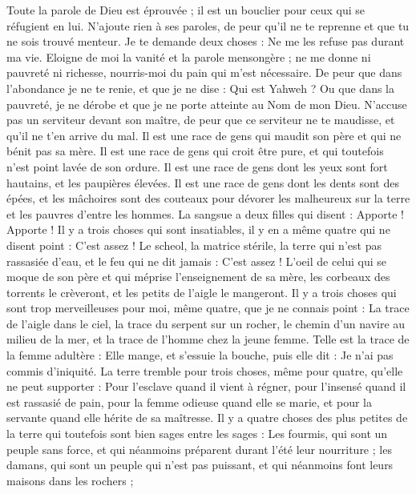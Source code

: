 \begin{multicols}{2}
Toute la parole de Dieu est éprouvée ; il est un bouclier pour ceux qui se réfugient en lui.
N'ajoute rien à ses paroles, de peur qu'il ne te reprenne et que tu ne sois trouvé menteur.
Je te demande deux choses : Ne me les refuse pas durant ma vie.
Eloigne de moi la vanité et la parole mensongère ; ne me donne ni pauvreté ni richesse, nourris-moi du pain qui m’est nécessaire.
De peur que dans l’abondance je ne te renie, et que je ne dise : Qui est Yahweh ? Ou que dans la pauvreté, je ne dérobe et que je ne porte atteinte au Nom de mon Dieu.
N’accuse pas un serviteur devant son maître, de peur que ce serviteur ne te maudisse, et qu'il ne t'en arrive du mal.
Il est une race de gens qui maudit son père et qui ne bénit pas sa mère.
Il est une race de gens qui croit être pure, et qui toutefois n'est point lavée de son ordure.
Il est une race de gens dont les yeux sont fort hautains, et les paupières élevées.
Il est une race de gens dont les dents sont des épées, et les mâchoires sont des couteaux pour dévorer les malheureux sur la terre et les pauvres d’entre les hommes.
La sangsue a deux filles qui disent : Apporte ! Apporte ! Il y a trois choses qui sont insatiables, il y en a même quatre qui ne disent point : C'est assez !
Le scheol, la matrice stérile, la terre qui n'est pas rassasiée d'eau, et le feu qui ne dit jamais : C'est assez !
L'oeil de celui qui se moque de son père et qui méprise l'enseignement de sa mère, les corbeaux des torrents le crèveront, et les petits de l'aigle le mangeront.
Il y a trois choses qui sont trop merveilleuses pour moi, même quatre, que je ne connais point :
La trace de l'aigle dans le ciel, la trace du serpent sur un rocher, le chemin d'un navire au milieu de la mer, et la trace de l'homme chez la jeune femme.
Telle est la trace de la femme adultère : Elle mange, et s'essuie la bouche, puis elle dit : Je n'ai pas commis d'iniquité.
La terre tremble pour trois choses, même pour quatre, qu’elle ne peut supporter :
Pour l’esclave quand il vient à régner, pour l'insensé quand il est rassasié de pain,
pour la femme odieuse quand elle se marie, et pour la servante quand elle hérite de sa maîtresse.
Il y a quatre choses des plus petites de la terre qui toutefois sont bien sages entre les sages :
Les fourmis, qui sont un peuple sans force, et qui néanmoins préparent durant l'été leur nourriture ;
les damans, qui sont un peuple qui n’est pas puissant, et qui néanmoins font leurs maisons dans les rochers ;

\end{multicols}
